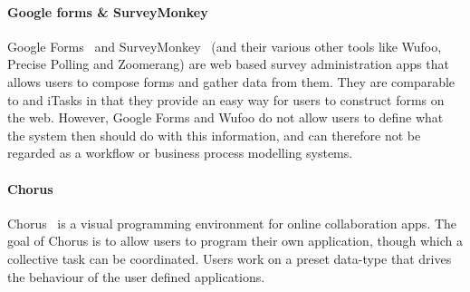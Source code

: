 \paragraph{Google forms \& SurveyMonkey}

Google Forms~\cite{googleforms} and SurveyMonkey~\cite{wufoo} (and their various other tools like Wufoo, Precise Polling and Zoomerang) are web based survey administration apps that allows
users to compose forms and gather data from them. They are comparable to \TOP and
iTasks in that they provide an easy way for users to construct forms on the web.
However, Google Forms and Wufoo do not allow users to define what the system
then should do with this information, and can therefore not be regarded as a
workflow or business process modelling systems.

\paragraph{Chorus} %

Chorus~\cite{chen2017chorus} is a visual programming environment for online
collaboration apps. The goal of Chorus is to allow users to program their own
application, though which a collective task can be coordinated. Users work on a
preset data-type that drives the behaviour of the user defined applications.
